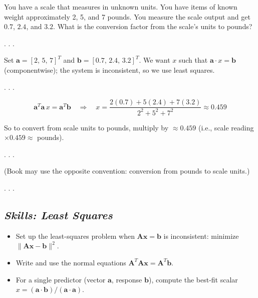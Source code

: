 \documentclass[
  letterpaper,
  DIV=11,
  numbers=noendperiod]{scrartcl}
\providecommand{\tightlist}{%
  \setlength{\itemsep}{0pt}\setlength{\parskip}{0pt}}\usepackage{longtable,booktabs,array}
\begin{document}
You have a scale that measures in unknown units. You have items of known
weight approximately 2, 5, and 7 pounds. You measure the scale output
and get \(0.7\), \(2.4\), and \(3.2\). What is the conversion factor
from the scale's units to pounds?

. . .

Set \(\mathbf{a}= [2,\, 5,\, 7]^T\) and
\(\mathbf{b}= [0.7,\, 2.4,\, 3.2]^T\). We want \(x\) such that
\(\mathbf{a} \cdot x = \mathbf{b}\) (componentwise); the system is
inconsistent, so we use least squares.

. . .

\[
\mathbf{a}^T \mathbf{a}\, x = \mathbf{a}^T \mathbf{b}
\quad \Rightarrow \quad
x = \frac{2(0.7) + 5(2.4) + 7(3.2)}{2^2 + 5^2 + 7^2} \approx 0.459
\]

So to convert from scale units to pounds, multiply by \(\approx 0.459\)
(i.e., scale reading \(\times 0.459 \approx\) pounds).

. . .

(Book may use the opposite convention: conversion from pounds to scale
units.)

. . .

\subsection{\texorpdfstring{\emph{Skills: Least
Squares}}{Skills: Least Squares}}\label{skills-least-squares}

\begin{itemize}
\tightlist
\item
  Set up the least-squares problem when
  \(\mathbf{A}\mathbf{x}=\mathbf{b}\) is inconsistent: minimize
  \(\|\mathbf{A}\mathbf{x}-\mathbf{b}\|^2\).
\item
  Write and use the normal equations
  \(\mathbf{A}^T \mathbf{A} \mathbf{x} = \mathbf{A}^T \mathbf{b}\).
\item
  For a single predictor (vector \(\mathbf{a}\), response
  \(\mathbf{b}\)), compute the best-fit scalar
  \(x = (\mathbf{a} \cdot \mathbf{b})/(\mathbf{a} \cdot \mathbf{a})\).
\end{itemize}
\end{document}
